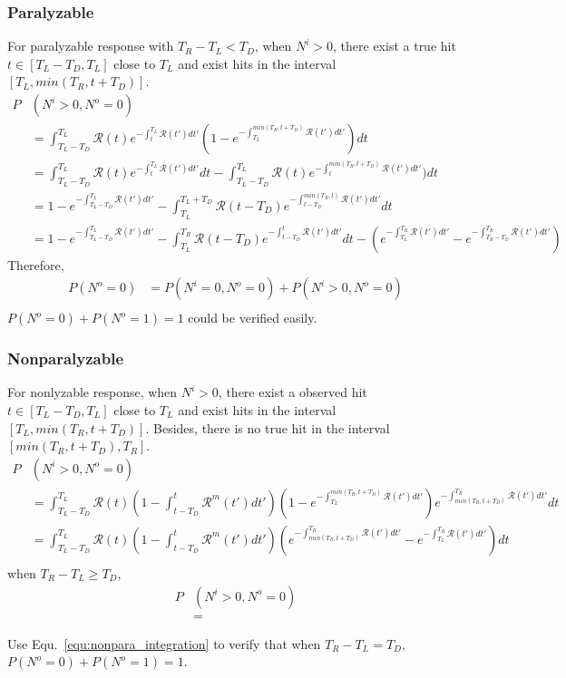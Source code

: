 \subsubsection{Paralyzable}
For paralyzable response with $T_R-T_L<T_D$, when $N^i>0$, there exist a true hit $t\in[T_L-T_D,T_L]$ close to $T_L$ and exist hits in the interval $[T_L, min(T_R,t+T_D)]$.
\begin{equation}
\begin{aligned}
P&(N^i>0,N^o=0)\\
&=\int_{T_L-T_D}^{T_L}{\mathcal{R}(t)e^{-\int_{t}^{T_L}{\mathcal{R}(t')dt'}}(1-e^{-\int_{T_L}^{min(T_R,t+T_D)}{\mathcal{R}(t')dt'}})dt}\\
&=\int_{T_L-T_D}^{T_L}{\mathcal{R}(t)e^{-\int_{t}^{T_L}{\mathcal{R}(t')dt'}}dt}-\int_{T_L-T_D}^{T_L}{\mathcal{R}(t)e^{-\int_{t}^{min(T_R,t+T_D)}{\mathcal{R}(t')dt'}})dt}\\
&=1-e^{-\int_{T_L-T_D}^{T_L}{\mathcal{R}(t')dt'}}-\int_{T_L}^{T_L+T_D}{\mathcal{R}(t-T_D)e^{-\int_{t-T_D}^{min(T_R,t)}{\mathcal{R}(t')dt'}}dt}\\
&=1-e^{-\int_{T_L-T_D}^{T_L}{\mathcal{R}(t')dt'}}-\int_{T_L}^{T_R}{\mathcal{R}(t-T_D)e^{-\int_{t-T_D}^{t}{\mathcal{R}(t')dt'}}dt} -(e^{-\int_{T_L}^{T_R}{\mathcal{R}(t')dt'}}-e^{-\int_{T_R-T_D}^{T_R}{\mathcal{R}(t')dt'}})
\end{aligned}
\end{equation}
Therefore, 
\begin{equation}
\begin{aligned}
P(N^o=0) &= P(N^i=0,N^o=0)+P(N^i>0,N^o=0)\\
\end{aligned}
\end{equation}
$P(N^o=0)+P(N^o=1)=1$ could be verified easily.

\subsubsection{Nonparalyzable}
For nonlyzable response, when $N^i>0$, there exist a observed hit $t\in[T_L-T_D,T_L]$ close to $T_L$ and exist hits in the interval $[T_L, min(T_R,t+T_D)]$. Besides, there is no true hit in the interval $[min(T_R,t+T_D),T_R]$.
\begin{equation}
\begin{aligned}
P&(N^i>0,N^o=0)\\
&=\int_{T_L-T_D}^{T_L}{\mathcal{R}(t)(1-\int_{t-T_D}^{t}{\mathcal{R}^m(t')dt'})(1-e^{-\int_{T_L}^{min(T_R,t+T_D)}{\mathcal{R}(t')dt'}})e^{-\int_{min(T_R,t+T_D)}^{T_R}{\mathcal{R}(t')dt'}}dt}\\
&=\int_{T_L-T_D}^{T_L}{\mathcal{R}(t)(1-\int_{t-T_D}^{t}{\mathcal{R}^m(t')dt'})(e^{-\int_{min(T_R,t+T_D)}^{T_R}{\mathcal{R}(t')dt'}}-e^{-\int_{T_L}^{T_R}{\mathcal{R}(t')dt'}})dt}\\
\end{aligned}
\end{equation}
when $T_R-T_L\geq T_D$,
\begin{equation}
\begin{aligned}
P&(N^i>0,N^o=0)\\
&=
\end{aligned}
\end{equation}

Use Equ.~\eqref{equ:nonpara_integration} to verify that when $T_R-T_L=T_D$, $P(N^o=0)+P(N^o=1)=1$.

